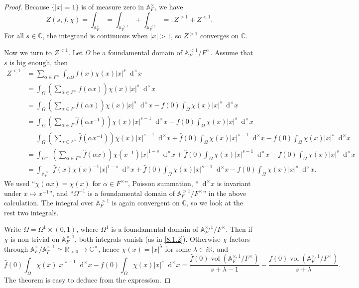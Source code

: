 \documentclass{article}
\theoremstyle{definition}
\theoremstyle{remark}
\renewcommand{\hat}{\widehat}
\newcommand{\R}{\mathbb{R}}
\newcommand{\C}{\mathbb{C}}
\newcommand{\adele}[1]{\mathbb{A}_{#1}}
\newcommand{\idele}[1]{\mathbb{A}_{#1}^{\times}}
\newcommand{\ideone}[1]{\mathbb{A}_{#1}^{\times, 1}}
\newcommand{\idecl}[1]{\mathbb{A}_{#1}^{\times, 1}/#1^{\times}}
\newcommand{\dxm}{\mathop{}\!\mathrm{d}^{\times}x}
\DeclareMathOperator{\vol}{vol}
\begin{document}
\begin{proof}
    Because $\{|x|=1\}$ is of measure zero in $\idele{F}$, we have
    \[Z(s, f, \chi) = \int_{\idele{F}}=\int_{\adele{F}^{>1}}+\int_{\adele{F}^{<1}}=: Z^{>1}+Z^{<1}.\]
    For all $s\in\C$, the integrand is continuous when $|x| > 1$, so $Z^{>1}$ converges on $\C$.

    Now we turn to $Z^{<1}$. Let $\Omega$ be a foundamental domain of $\adele{F}^{<1}/F^\times$.
    Assume that $s$ is big enough, then\begin{align*}
        Z^{<1} &= \sum_{\alpha\in F^{\times}}\int_{\alpha\Omega} f(x)\chi(x)|x|^s\dxm\\
        &= \int_\Omega \left( \sum_{\alpha\in F^{\times}}f(\alpha x) \right) \chi(x)|x|^s\dxm\\
        &= \int_\Omega \left( \sum_{\alpha\in F} f(\alpha x) \right)\chi(x)|x|^s\dxm - f(0)\int_\Omega\chi(x)|x|^s\dxm\\
        &= \int_\Omega\left( \sum_{\alpha\in F}\hat{f}(\alpha x^{-1}) \right) \chi(x)|x|^{s-1}\dxm - f(0)\int_\Omega\chi(x)|x|^s\dxm\\ 
        &= \int_\Omega\left( \sum_{\alpha\in F^{\times}}\hat{f}(\alpha x^{-1}) \right)\chi(x)|x|^{s-1}\dxm + \hat{f}(0)\int_\Omega\chi(x)|x|^{s-1}\dxm - f(0)\int_\Omega\chi(x)|x|^s\dxm\\
        &= \int_{\Omega^{-1}}\left( \sum_{\alpha\in F^\times}\hat{f}(\alpha x) \right)\chi(x^{-1})|x|^{1-s}\dxm + \hat{f}(0)\int_\Omega\chi(x)|x|^{s-1}\dxm - f(0)\int_\Omega\chi(x)|x|^s\dxm\\
        &= \int_{\adele{F}^{>1}} \hat{f}(x)\chi(x)^{-1}|x|^{1-s}\dxm + \hat{f}(0)\int_\Omega\chi(x)|x|^{s-1}\dxm - f(0)\int_\Omega\chi(x)|x|^s\dxm.
    \end{align*}
    We used ``$\chi(\alpha x) = \chi(x)$ for $\alpha\in F^{\times}$'', Poisson summation, ``$\dxm$ is invariant under $x\mapsto x^{-1}$'', and ``$\Omega^{-1}$ is a foundamental domain of $\adele{F}^{>1}/F^{\times}$'' in the above calculation.
    The integral over $\adele{F}^{>1}$ is again convergent on $\C$, so we look at the rest two integrals.

    Write $\Omega = \Omega^1\times(0, 1)$, where $\Omega^1$ is a foundamental domain of $\idecl{F}$.
    Then if $\chi$ is non-trivial on $\ideone{F}$, both integrals vanish (as in \cref{8.1.2}).
    Otherwise $\chi$ factors through $\idele{F}/\ideone{F}\simeq\R_{>0}\to\C^{\times}$, hence $\chi(x) = |x|^\lambda$ for some $\lambda\in i\R$, and
    \[\hat{f}(0)\int_\Omega\chi(x)|x|^{s-1}\dxm - f(0)\int_\Omega\chi(x)|x|^s\dxm = \frac{\hat{f}(0)\vol(\idecl{F})}{s+\lambda-1} - \frac{f(0)\vol(\idecl{F})}{s+\lambda}.\]
    The theorem is easy to deduce from the expression. 
\end{proof}
\end{document}
